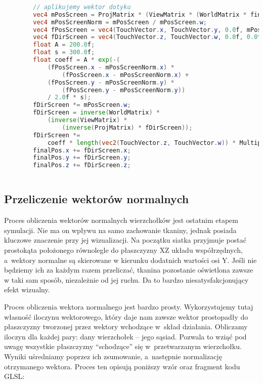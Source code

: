 		\begin{lstlisting}[language=GLSL]
		
		// aplikujemy wektor dotyku
		vec4 mPosScreen = ProjMatrix * (ViewMatrix * (WorldMatrix * finalPos));
		vec4 mPosScreenNorm = mPosScreen / mPosScreen.w;
		vec4 fPosScreen = vec4(TouchVector.x, TouchVector.y, 0.0f, mPosScreenNorm.w);
		vec4 fDirScreen = vec4(TouchVector.z, TouchVector.w, 0.0f, 0.0f);
		float A = 200.0f;
		float s = 300.0f;
		float coeff = A * exp(-(
			(fPosScreen.x - mPosScreenNorm.x) * 
				(fPosScreen.x - mPosScreenNorm.x) +
			(fPosScreen.y - mPosScreenNorm.y) * 
				(fPosScreen.y - mPosScreenNorm.y)) 
			/ 2.0f * s);
		fDirScreen *= mPosScreen.w;
		fDirScreen = inverse(WorldMatrix) * 
			(inverse(ViewMatrix) * 
				(inverse(ProjMatrix) * fDirScreen));
		fDirScreen *= 
			coeff * length(vec2(TouchVector.z, TouchVector.w)) * Multipliers.x;
		finalPos.x += fDirScreen.x;
		finalPos.y += fDirScreen.y;
		finalPos.z += fDirScreen.z;
		
		\end{lstlisting}
			
		\subsection{Przeliczenie wektorów normalnych}
		\label{t:symulacja:dzialanie:normalne}
			
		
		Proces obliczenia wektorów normalnych wierzchołków jest ostatnim etapem symulacji. Nie ma on wpływu na samo zachowanie tkaniny, jednak posiada kluczowe znaczenie przy jej wizualizacji. Na początku siatka przyjmuje postać prostokąta położonego równolegle do płaszczyzny XZ układu współrzędnych, a~wektory normalne są skierowane w kierunku dodatnich wartości osi Y. Jeśli nie będziemy ich za każdym razem przeliczać, tkanina pozostanie oświetlona zawsze w taki sam sposób, niezależnie od jej ruchu. Da to bardzo niesatysfakcjonujący efekt wizualny.
		
		Proces obliczenia wektora normalnego jest bardzo prosty. Wykorzystujemy tutaj własność iloczynu wektorowego, który daje nam zawsze wektor prostopadły do płaszczyzny tworzonej przez wektory wchodzące w~skład działania. Obliczamy iloczyn dla każdej pary: dany wierzchołek -- jego sąsiad. Pozwala to wziąć pod uwagę wszystkie płaszczyzny ``schodzące'' się w~przetwarzanym wierzchołku. Wyniki uśredniamy poprzez ich zsumowanie, a~następnie normalizację otrzymanego wektora. Proces ten opisują poniższy wzór oraz fragment kodu GLSL:
		
